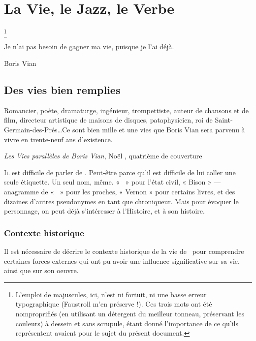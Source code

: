 \mainmatter
\chapter{La Vie, le Jazz, le Verbe}\footnote{L'emploi de majuscules, ici,
n'est ni fortuit, ni une basse erreur typographique (Faustroll m'en préserve !). Ces trois mots ont été nomproprifiés (en utilisant un détergent du
meilleur tonneau, préservant les couleurs) à dessein et sans scrupule,
étant donné l'importance de ce qu'ils représentent avaient pour le sujet du
présent document.}
\epigraph{%
Je n'ai pas besoin de gagner ma vie, puisque je l'ai déjà.}{Boris Vian}
\vfill
\pagebreak
\section{Des vies bien remplies}
\epigraph{Romancier, poète, dramaturge, ingénieur, trompettiste, auteur
de chansons et de film, directeur artistique de maisons de disques, pataphysicien, roi
de Saint-Germain-des-Prés\ldots Ce sont bien mille et une vies que Boris Vian sera parvenu
à vivre en trente-neuf ans d'existence.}
{\emph{Les Vies parallèles de Boris Vian}, Noël , quatrième de couverture}


\lettrine{I}l est difficile de parler de \BV. Peut-être parce qu'il
est difficile de lui coller une seule étiquette. Un seul nom,
même. « \BV\ » pour l'état civil, « Bison  » --- anagramme
de « \BV\ » pour les proches, « Vernon  » pour certains
livres, et des dizaines d'autres pseudonymes en tant que chroniqueur.
Mais pour évoquer le personnage, on peut déjà s'intéresser à l'Histoire,
et à son histoire.


\subsection{Contexte historique}
Il est nécessaire de décrire le contexte historique de la vie
de \BV\ pour comprendre certaines forces externes qui
ont pu avoir une influence significative sur sa vie, ainsi que
sur son oeuvre.

